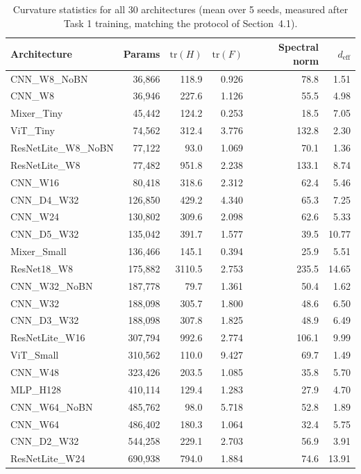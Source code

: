 \begin{table}[h]
\centering
\caption{Curvature statistics for all 30 architectures (mean over 5 seeds, measured after Task 1 training, matching the protocol of Section~4.1).}
\label{tab:curvature}
\tiny
\begin{tabular}{lrrrrr}
\toprule
Architecture & Params & $\mathrm{tr}(H)$ & $\mathrm{tr}(F)$ & Spectral norm & $d_{\mathrm{eff}}$ \\
\midrule
CNN\_W8\_NoBN & 36,866 & 118.9 & 0.926 & 78.8 & 1.51 \\
CNN\_W8 & 36,946 & 227.6 & 1.126 & 55.5 & 4.98 \\
Mixer\_Tiny & 45,442 & 124.2 & 0.253 & 18.5 & 7.05 \\
ViT\_Tiny & 74,562 & 312.4 & 3.776 & 132.8 & 2.30 \\
ResNetLite\_W8\_NoBN & 77,122 & 93.0 & 1.069 & 70.1 & 1.36 \\
ResNetLite\_W8 & 77,482 & 951.8 & 2.238 & 133.1 & 8.74 \\
CNN\_W16 & 80,418 & 318.6 & 2.312 & 62.4 & 5.46 \\
CNN\_D4\_W32 & 126,850 & 429.2 & 4.340 & 65.3 & 7.25 \\
CNN\_W24 & 130,802 & 309.6 & 2.098 & 62.6 & 5.33 \\
CNN\_D5\_W32 & 135,042 & 391.7 & 1.577 & 39.5 & 10.77 \\
Mixer\_Small & 136,466 & 145.1 & 0.394 & 25.9 & 5.51 \\
ResNet18\_W8 & 175,882 & 3110.5 & 2.753 & 235.5 & 14.65 \\
CNN\_W32\_NoBN & 187,778 & 79.7 & 1.361 & 50.4 & 1.62 \\
CNN\_W32 & 188,098 & 305.7 & 1.800 & 48.6 & 6.50 \\
CNN\_D3\_W32 & 188,098 & 307.8 & 1.825 & 48.9 & 6.49 \\
ResNetLite\_W16 & 307,794 & 992.6 & 2.774 & 106.1 & 9.99 \\
ViT\_Small & 310,562 & 110.0 & 9.427 & 69.7 & 1.49 \\
CNN\_W48 & 323,426 & 203.5 & 1.085 & 35.8 & 5.70 \\
MLP\_H128 & 410,114 & 129.4 & 1.283 & 27.9 & 4.70 \\
CNN\_W64\_NoBN & 485,762 & 98.0 & 5.718 & 52.8 & 1.89 \\
CNN\_W64 & 486,402 & 180.3 & 1.064 & 32.4 & 5.75 \\
CNN\_D2\_W32 & 544,258 & 229.1 & 2.703 & 56.9 & 3.91 \\
ResNetLite\_W24 & 690,938 & 794.0 & 1.884 & 74.6 & 13.91 \\

\end{tabular}
\end{table}
